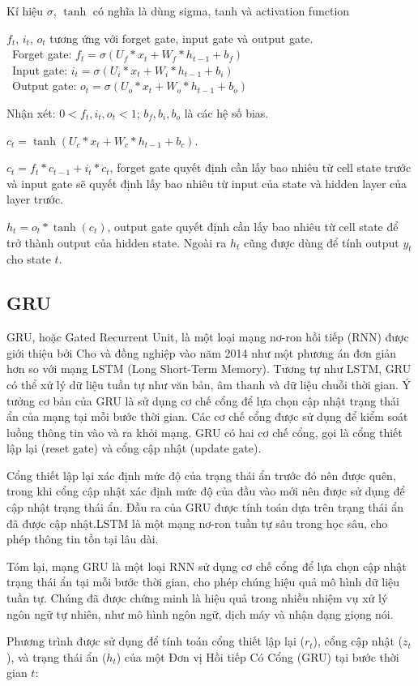 Kí hiệu \(\sigma\), \(\tanh\) có nghĩa là dùng sigma, tanh và activation function
\par
\( f_t \), \( i_t \), \( o_t \) tương ứng với forget gate, input gate và output gate.\\
    \indent\textbullet\ Forget gate: \( f_t = \sigma\left(U_f \ast x_t + W_f \ast h_{t-1} + b_f\right) \)\\
    \indent\textbullet\ Input gate: \( i_t = \sigma\left(U_i \ast x_t + W_i \ast h_{t-1} + b_i\right) \)\\
    \indent\textbullet\ Output gate: \( o_t = \sigma\left(U_o \ast x_t + W_o \ast h_{t-1} + b_o\right) \)
\par
Nhận xét: \( 0 < f_t, i_t, o_t < 1 \); \( b_f, b_i, b_o \) là các hệ số bias.
\par
\( c_t = \tanh\left(U_c \ast x_t + W_c \ast h_{t-1} + b_c\right) \).
\par
\( c_t = f_t \ast c_{t-1} + i_t \ast c_t \), forget gate quyết định cần lấy bao nhiêu từ cell state trước và input gate sẽ quyết định lấy bao nhiêu từ input của state và hidden layer của layer trước.
\par
\( h_t = o_t \ast \tanh\left(c_t\right) \), output gate quyết định cần lấy bao nhiêu từ cell state để trở thành output của hidden state. Ngoài ra \( h_t \) cũng được dùng để tính output \( y_t \) cho state \( t \).


\subsection{GRU}
GRU, hoặc Gated Recurrent Unit, là một loại mạng nơ-ron hồi tiếp (RNN) được giới thiệu bởi Cho và đồng nghiệp vào năm 2014 như một phương án đơn giản hơn so với mạng LSTM (Long Short-Term Memory). Tương tự như LSTM, GRU có thể xử lý dữ liệu tuần tự như văn bản, âm thanh và dữ liệu chuỗi thời gian.
Ý tưởng cơ bản của GRU là sử dụng cơ chế cổng để lựa chọn cập nhật trạng thái ẩn của mạng tại mỗi bước thời gian. Các cơ chế cổng được sử dụng để kiểm soát luồng thông tin vào và ra khỏi mạng. GRU có hai cơ chế cổng, gọi là cổng thiết lập lại (reset gate) và cổng cập nhật (update gate).
\par
Cổng thiết lập lại xác định mức độ của trạng thái ẩn trước đó nên được quên, trong khi cổng cập nhật xác định mức độ của đầu vào mới nên được sử dụng để cập nhật trạng thái ẩn. Đầu ra của GRU được tính toán dựa trên trạng thái ẩn đã được cập nhật.LSTM là một mạng nơ-ron tuần tự sâu trong học sâu, cho phép thông tin tồn tại lâu dài.
\par
Tóm lại, mạng GRU là một loại RNN sử dụng cơ chế cổng để lựa chọn cập nhật trạng thái ẩn tại mỗi bước thời gian, cho phép chúng hiệu quả mô hình dữ liệu tuần tự. Chúng đã được chứng minh là hiệu quả trong nhiều nhiệm vụ xử lý ngôn ngữ tự nhiên, như mô hình ngôn ngữ, dịch máy và nhận dạng giọng nói.
\par
Phương trình được sử dụng để tính toán cổng thiết lập lại (\(r_t\)), cổng cập nhật (\(z_t\)), và trạng thái ẩn (\(h_t\)) của một Đơn vị Hồi tiếp Có Cổng (GRU) tại bước thời gian \(t\):

